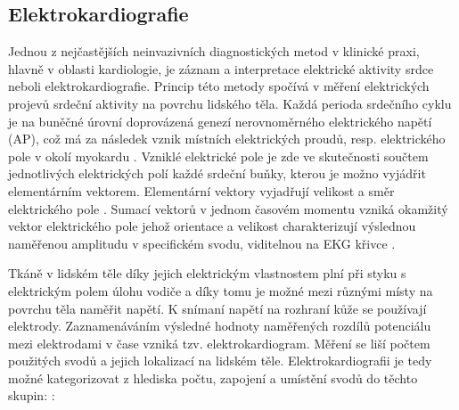 \subsection{Elektrokardiografie}
\label{section:electrocardiography}
Jednou z nejčastějších neinvazivních diagnostických metod v klinické praxi,
hlavně v oblasti kardiologie, je záznam a interpretace elektrické aktivity srdce
neboli elektrokardiografie. Princip této metody spočívá v měření elektrických
projevů srdeční aktivity na povrchu lidského těla. Každá perioda srdečního cyklu
je na buněčné úrovní doprovázená genezí nerovnoměrného elektrického napětí (AP),
což má za následek vznik místních elektrických proudů, resp. elektrického pole v
okolí myokardu \cite{Kittnar2020}. Vzniklé elektrické pole je zde ve skutečnosti
součtem jednotlivých elektrických polí každé srdeční buňky, kterou je možno
vyjádřit elementárním vektorem. Elementární vektory vyjadřují velikost a směr
elektrického pole \cite{Stejfa2006}. Sumací vektorů v jednom časovém momentu
vzniká okamžitý vektor elektrického pole jehož orientace a velikost
charakterizují výslednou naměřenou amplitudu v specifickém svodu, viditelnou na
EKG křivce \cite{Surawicz2008,Kittnar2020}.

Tkáně v lidském těle díky jejich elektrickým vlastnostem plní při styku s
elektrickým polem úlohu vodiče a díky tomu je možné mezi různými místy na
povrchu těla naměřit napětí. K snímaní napětí na rozhraní kůže se používají
elektrody. Zaznamenáváním výsledné hodnoty naměřených rozdílů potenciálu mezi
elektrodami v čase vzniká tzv. elektrokardiogram. Měření se liší počtem
použitých svodů a jejich lokalizací na lidském těle. Elektrokardiografii je tedy
možné kategorizovat z hlediska počtu, zapojení a umístění svodů do těchto
skupin: \cite{Haberl2012,Kittnar2020}:

